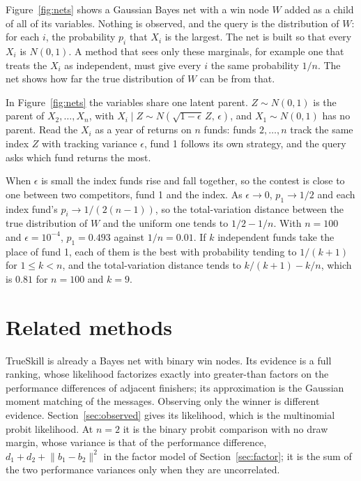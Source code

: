 \documentclass[11pt]{article}
\begin{document}
Figure~\ref{fig:nets} shows a Gaussian Bayes net with a win node $W$
added as a child of all of its variables. Nothing is observed, and
the query is the distribution of $W$: for each $i$, the probability
$p_i$ that $X_i$ is the largest. The net is built so that every $X_i$
is $N(0,1)$. A method that sees only these marginals, for example one
that treats the $X_i$ as independent, must give every $i$ the same
probability $1/n$. The net shows how far the true distribution of $W$
can be from that.

In Figure~\ref{fig:nets} the variables share one latent parent.
$Z\sim N(0,1)$ is the parent of $X_2,\dots,X_n$, with
$X_i\mid Z\sim N(\sqrt{1-\epsilon}\,Z,\,\epsilon)$, and $X_1\sim N(0,1)$
has no parent. Read the $X_i$ as a year of returns on $n$ funds: funds
$2,\dots,n$ track the same index $Z$ with tracking variance
$\epsilon$, fund 1 follows its own strategy, and the query asks which
fund returns the most.

When $\epsilon$ is small the index funds rise
and fall together, so the contest is close to one between two
competitors, fund 1 and the index. As $\epsilon\to0$, $p_1\to1/2$ and
each index fund's $p_i\to1/(2(n-1))$, so the total-variation distance
between the true distribution of $W$ and the uniform one tends to
$1/2-1/n$. With $n=100$ and $\epsilon=10^{-4}$, $p_1=0.493$ against
$1/n=0.01$. If $k$ independent funds take the place of fund 1, each
of them is the best with probability tending to $1/(k+1)$ for
$1\le k<n$, and the
total-variation distance tends to $k/(k+1)-k/n$, which is $0.81$ for
$n=100$ and $k=9$.

\section{Related methods}
\label{sec:related}

TrueSkill \citep{herbrich2007} is already a Bayes net with binary win
nodes. Its evidence is a full ranking, whose likelihood factorizes
exactly into greater-than factors on the performance differences of
adjacent finishers; its approximation is the Gaussian moment matching
of the messages. Observing only the winner is different evidence.
Section~\ref{sec:observed} gives its likelihood, which is the
multinomial probit likelihood. At $n=2$ it is the binary probit
comparison with no draw margin, whose variance is that of the
performance difference, $d_1+d_2+\lVert b_1-b_2\rVert^2$ in the factor
model of Section~\ref{sec:factor}; it is the sum of the two
performance variances only when they are uncorrelated.
\end{document}
